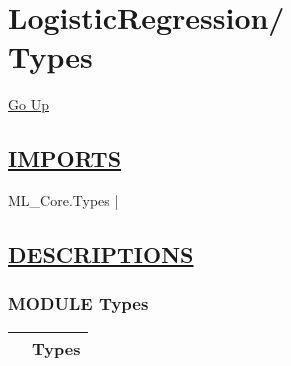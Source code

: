 \chapter*{\color{headfile}
{\large LogisticRegression\slash\hspace{0pt}}
 \\
Types
}
\hypertarget{ecldoc:toc:LogisticRegression.Types}{}
\hyperlink{ecldoc:toc:root/LogisticRegression}{Go Up}

\section*{\underline{\textsf{IMPORTS}}}
\begin{doublespace}
{\large
ML\_Core.Types |
}
\end{doublespace}

\section*{\underline{\textsf{DESCRIPTIONS}}}
\subsection*{\textsf{\colorbox{headtoc}{\color{white} MODULE}
Types}}

\hypertarget{ecldoc:LogisticRegression.Types}{}

{\renewcommand{\arraystretch}{1.5}
\begin{tabularx}{\textwidth}{|>{\raggedright\arraybackslash}l|X|}
\hline
\hspace{0pt}\mytexttt{\color{red} } & \textbf{Types} \\
\hline
\end{tabularx}
}

\par


